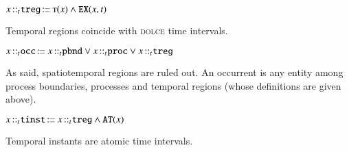 \documentclass[ao]{iosart2x}
\newcommand{\nb}[1]{\textcolor{red}{$|$}\marginpar{\hspace*{-0cm}\parbox{20mm}{\scriptsize\raggedright\textcolor{red}{#1}}}}
\newcommand{\bfoAxLabel}{\textrm{a$_\texttt{b}$}}
\newcommand{\dbDefLabel}{\textrm{d$_\texttt{db}$}}
\newcounter{cntdbdf}
\newcommand{\dbdf}[1]{\refstepcounter{cntdbdf}\begin{small}{\bf \dbDefLabel\thecntdbdf\label{#1}}\end{small}}
\newcommand{\refbfoax}[1]{({\bfoAxLabel}\ref{#1})}
\newcommand{\pr}[1]{\mathtt{#1}}
\newcommand{\cn}[1]{\mathtt{#1}}
\newcommand\textequal{%
 \rule[.08ex]{5pt}{0.35pt}\llap{\rule[.78ex]{5pt}{0.35pt}}}
\newcommand{\sdef}{{\hspace{1.5pt}:\hspace{-2.5pt}\textequal\hspace{3pt}}}
\newcommand{\dolce}{{\textsc{dolce}}}
\newcommand{\bfo}{{\textsc{bfo}}}
\newcommand {\Tdcat} {\textsc{t}}
\newcommand {\ATd} {\ensuremath{\pr{AT}}}
\newcommand{\occbcat}{\cn{occ}}
\newcommand{\procbcat}{\cn{proc}}
\newcommand{\pbndbcat}{\cn{pbnd}}
\newcommand{\tregbcat}{\cn{treg}}
\newcommand{\stregbcat}{\cn{streg}}
\newcommand{\tinstbcat}{\cn{tinst}}
\newcommand{\bfoexist}{\pr{EX}}
\newcommand{\bfoiof}[1]{{\,::_{#1\:\!}}}
\begin{document}
\item[\dbdf{d2b_treg}] $x \bfoiof{t} \tregbcat \sdef \Tdcat(x) \land \bfoexist(x,t)$

\vspace{1pt}
Temporal regions coincide with {\dolce} time intervals.

%
%
%

\item[\dbdf{d2b_occ}] $x \bfoiof{t} \occbcat \sdef x \bfoiof{t} \pbndbcat \lor x \bfoiof{t} \procbcat \lor x \bfoiof{t} \tregbcat$

\vspace{1pt}
As said, spatiotemporal regions are ruled out. An occurrent is any entity among process boundaries, processes and temporal regions (whose definitions are given above).

%

\item[\dbdf{d2b_tinst}]  $x \bfoiof{t} \tinstbcat \sdef x \bfoiof{t} \tregbcat \land \ATd(x)$

\vspace{1pt}
Temporal instants are atomic time intervals.

% 
\end{document}
